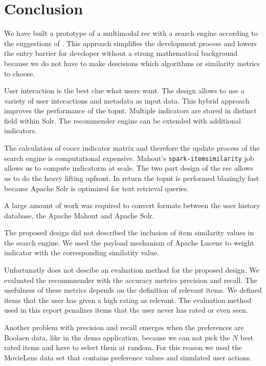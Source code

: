 \section{Conclusion}
\label{sec:conclusion}

We have built a prototype of a \gls{multimodal} \gls{rec} with a search engine according to the suggestions of \cite{Dunning14}. 
This approach simplifies the development process and lowers the entry barrier for developer without a strong mathematical background because we do not have to make descisions which algorithms or similarity metrics to choose. 

User interaction is the best clue what users want.
The design allows to use a variety of user interactions and metadata as input data. This hybrid approach improves the performance of the \gls{topnt}. Multiple \glspl{indicator} are stored in distinct field within Solr. The recommender engine can be extended with additional \glspl{indicator}.


The calculation of \gls{coocc} indicator matrix and therefore the update process of the search engine is computational expensive. Mahout's \verb|spark-itemsimilarity| job allows us to compute \gls{indicatorm} at scale.
The two part design of the \gls{rec} allows us to do the heavy lifting upfront. In return the \gls{topnt} is performed blazingly fast because Apache Solr is optimized for text retrieval queries. 

A large amount of work was required to convert formats between the user history database, the Apache Mahout and Apache Solr. 

The proposed design did not described the inclusion of item similarity values in the search engine. We used the payload mechanism of Apache Lucene to weight indicator with the corresponding similatity value.

Unfortunatly \cite{Dunning14} does not descibe an evaluation method for the proposed design. We evaluated the recommnender with the accuracy metrics precision and recall. The usefulness of these metrics depends on the definition of relevant items. We defined items that the user has given a high rating as relevant. The evaluation method used in this report penalizes items that the user never has rated or even seen. 

Another problem with precision and recall emerges when the preferences are Boolaen data, like in the demo application, because we can not pick the $N$ best rated items and have to select them at random. For this reason we used the MovieLens data set that contains preference values and simulated user actions.

